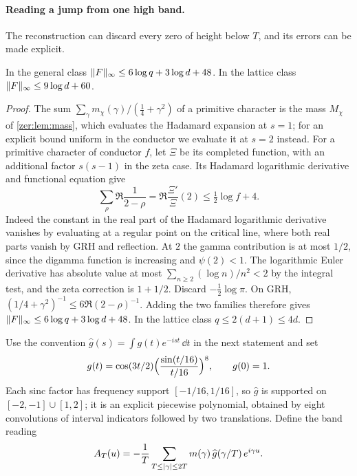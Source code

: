 \paragraph{Reading a jump from one high band.}
The reconstruction can discard every zero of height below $T$, and its errors can be made
explicit.

\begin{lemma}[\stG]\label{rec:lem:Fbound}
In the general class $\lVert F\rVert_\infty\le6\log q+3\log d+48$. In the lattice class
$\lVert F\rVert_\infty\le9\log d+60$.
\end{lemma}
\begin{proof}
The sum $\sum_\gamma m_\chi(\gamma)/(\tfrac14+\gamma^2)$ of a primitive character is the mass $M_\chi$ of
\cref{zer:lem:mass}, which evaluates the Hadamard expansion at $s=1$; for an explicit bound uniform in the
conductor we evaluate it at $s=2$ instead. For a primitive character of conductor $f$, let $\Xi$ be its completed function, with an
additional factor $s(s-1)$ in the zeta case. Its Hadamard logarithmic derivative and
functional equation give
\[
 \sum_\rho\Re\frac1{2-\rho}=\Re\frac{\Xi'}{\Xi}(2)\le\tfrac12\log f+4 .
\]
Indeed the constant in the real part of the Hadamard logarithmic derivative vanishes by
evaluating at a regular point on the critical line, where both real parts vanish by GRH and
reflection. At $2$ the gamma contribution is at most $1/2$, since the digamma function is
increasing and $\psi(2)<1$. The logarithmic Euler derivative has absolute value at most
$\sum_{n\ge2}(\log n)/n^2<2$ by the integral test, and the zeta correction is $1+1/2$.
Discard $-\tfrac12\log\pi$. On GRH, $(1/4+\gamma^2)^{-1}\le6\Re(2-\rho)^{-1}$. Adding the
two families therefore gives $\lVert F\rVert_\infty\le6\log q+3\log d+48$. In the lattice class
$q\le2(d+1)\le4d$.
\end{proof}

Use the convention $\widehat g(s)=\int g(t)e^{-ist}\,\dd t$ in the next statement and set
\[
 g(t)=\cos(3t/2)\Bigl(\frac{\sin(t/16)}{t/16}\Bigr)^8,\qquad g(0)=1 .
\]
Each sinc factor has frequency support $[-1/16,1/16]$, so $\widehat g$ is supported on
$[-2,-1]\cup[1,2]$; it is an explicit piecewise polynomial, obtained by eight convolutions
of interval indicators followed by two translations. Define the band reading
\begin{equation}\label{rec:eq:AT}
 A_T(u)=-\frac1T\sum_{T\le\lvert\gamma\rvert\le2T}m(\gamma)\,\widehat g(\gamma/T)\,e^{i\gamma u}.
\end{equation}

